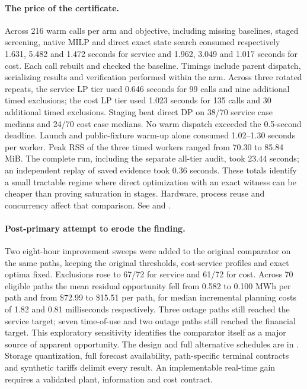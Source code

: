\documentclass[10pt,letterpaper]{article}
\begin{document}
\paragraph{The price of the certificate.}
Across 216 warm calls per arm and objective, including missing baselines, staged screening, native MILP and direct exact state search consumed respectively 1.631, 5.482 and 1.472 seconds for service and 1.962, 3.049 and 1.017 seconds for cost. Each call rebuilt and checked the baseline. Timings include parent dispatch, serializing results and verification performed within the arm. Across three rotated repeats, the service LP tier used 0.646 seconds for 99 calls and nine additional timed exclusions; the cost LP tier used 1.023 seconds for 135 calls and 30 additional timed exclusions. Staging beat direct DP on 38/70 service case medians and 24/70 cost case medians. No warm dispatch exceeded the 0.5-second deadline. Launch and public-fixture warm-up alone consumed 1.02--1.30 seconds per worker. Peak RSS of the three timed workers ranged from 70.30 to 85.84 MiB. The complete run, including the separate all-tier audit, took 23.44 seconds; an independent replay of saved evidence took 0.36 seconds. These totals identify a small tractable regime where direct optimization with an exact witness can be cheaper than proving saturation in stages. Hardware, process reuse and concurrency affect that comparison. See  and .

\paragraph{Post-primary attempt to erode the finding.}
Two eight-hour improvement sweeps were added to the original comparator on the same paths, keeping the original thresholds, cost-service profiles and exact optima fixed. Exclusions rose to 67/72 for service and 61/72 for cost. Across 70 eligible paths the mean residual opportunity fell from 0.582 to 0.100 MWh per path and from \$72.99 to \$15.51 per path, for median incremental planning costs of 1.82 and 0.81 milliseconds respectively. Three outage paths still reached the service target; seven time-of-use and two outage paths still reached the financial target. This exploratory sensitivity identifies the comparator itself as a major source of apparent opportunity. The design and full alternative schedules are in . Storage quantization, full forecast availability, path-specific terminal contracts and synthetic tariffs delimit every result. An implementable real-time gain requires a validated plant, information and cost contract.
\end{document}
